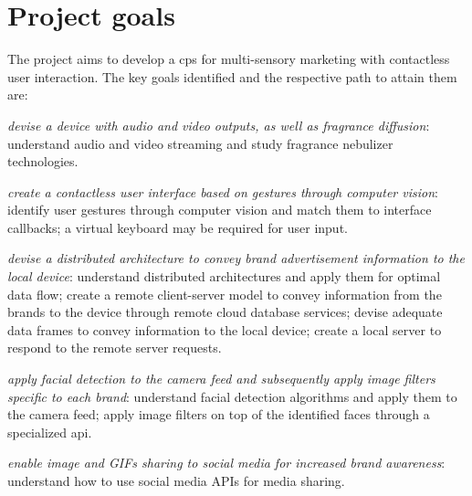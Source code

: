 \section{Project goals}%
\label{sec:project-goals}
The project aims to develop a \gls{cps} for multi-sensory marketing with
contactless user interaction. The key goals identified and the respective path
to attain them are:
\begin{enum-c}
\item \emph{devise a device with audio and video outputs, as well as fragrance
    diffusion}: understand audio and video streaming and study fragrance
  nebulizer technologies.
\item \emph{create a contactless user interface based on gestures through
    computer vision}: identify user gestures through computer vision and match them to interface
  callbacks; a virtual keyboard may be required for user input.
\item \emph{devise a distributed architecture to convey brand advertisement
  information to the local device}: understand distributed architectures and
apply them for optimal data flow; create a remote client-server model to convey
information from the brands to the device through remote cloud database
services; devise adequate data frames to convey information to the local device;
create a local server to respond to the remote server requests.
\item \emph{apply facial detection to the camera feed and subsequently apply
  image filters specific to each brand}: understand facial detection
algorithms and apply them to the camera feed; apply image filters on top of the
identified faces through a specialized \gls{api}.
\item \emph{enable image and GIFs sharing to social media for increased brand
    awareness}: understand how to use social media APIs for media sharing.
\end{enum-c}
%
